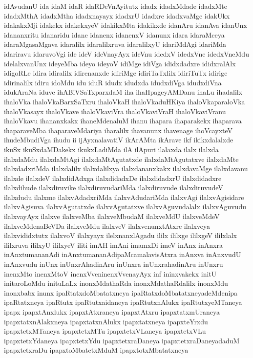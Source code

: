 {idAvudanU
ida
idaM
idaR
idaRDeVnAyitutx
idadx
idadxMdade
idadxMte
idadxMthA
idadxMtha
idadxnayayx
idadxrU
idadxre
idadxvaMge
idakUkx
idakakxMji
idakekx
idakekxyeV
idakikxMta
idakikxde
idanAru
idanAva
idanUnx
idananxritu
idanaridu
idane
idanenx
idanenxV
idanunx
idara
idaraMceya
idaraMgasaMgava
idaralilx
idaralilxruva
idaralilxyU
idariMdAgi
idariMda
idariravu
idaruvoVgi
ide
ideV
ideVnayAyx
ideVnu
idedxV
idedxVne
idedxVneMdu
idelalxvanUnx
ideyeMba
ideyo
ideyoV
idiMge
idiVga
ididxdadxre
ididxralAlx
idigoRLe
idira
idiralilx
idirenanxde
idiriMge
idiriTaTxlilx
idiriTuTx
idirige
idirinalilx
idiru
idoMdu
idu
iduR
idudx
idudxda
idudxdiVga
idudxdiVna
idukAraNa
iduve
ihABiVSaTxparxdaM
iha
ihaHpageyAMDanu
ihaLu
ihadalilx
ihaloVka
ihaloVkaBarxSaTxru
ihaloVkaH
ihaloVkaduHKiya
ihaloVkaparaloVka
ihaloVkasayx
ihaloVkave
ihaloVkaviVra
ihaloVkaviVraH
ihaloVkaviVranu
ihaloVkavu
ihananxkakx
ihaneMdenaluM
ihanu
ihapara
ihaparakekx
ihaparava
ihaparaveMba
ihaparaveMdariya
iharalilx
ihavanunx
ihavenage
ihoVcayxteV
ihudeMbudiVga
ihudu
ii
ijAyxnalavatiV
ikArAMta
ikArave
ikf
ikikxdalalxde
ikuSx
ikuSxdaMDakekx
ikukxLadiMda
ilA
ilApuri
ilalaxda
ilalx
ilalxda
ilalxdaMdu
ilalxdaMtAgi
ilalxdaMtAgutatxde
ilalxdaMtAgutatxve
ilalxdaMte
ilalxdadxriMda
ilalxdalilx
ilalxdalilxya
ilalxdananxkakx
ilalxdavaMge
ilalxdavanu
ilalxde
ilalxdeV
ilalxdidAdxga
ilalxdidadxDe
ilalxdidadxrU
ilalxdidadxre
ilalxdihude
ilalxdiruvike
ilalxdiruvudariMda
ilalxdiruvude
ilalxdiruvudeV
ilalxdudu
ilalxme
ilalxvAdadxriMda
ilalxvAdudariMda
ilalxvAgi
ilalxvAgisidare
ilalxvAgisuva
ilalxvAgutatxde
ilalxvAgutatxve
ilalxvAguvudalalx
ilalxvAguvudu
ilalxvayAyx
ilalxve
ilalxveMba
ilalxveMbudaM
ilalxveMdU
ilalxveMdeV
ilalxveMdenaBeVDa
ilalxveMdu
ilalxveV
ilalxvenunxtAtxre
ilalxveya
ilalxvididxtutx
ilalxvoV
ilalxyayx
ilelxnanxlAgadu
ililx
ililxge
ililxgeV
ililxlalx
ililxruva
ililxyU
ililxyeV
iliti
imAH
imAni
imamxDi
imeV
inAnx
inAnxra
inAnxtumananAdi
inAnxtumananAdipaMcamalavisAtxra
inAnxva
inAnxvudU
inAnxvudu
inUnx
inUnxrAhadinAru
inUnxra
inUnxrahadinAru
inUnxru
inenxMto
inenxMtoV
inenxVveninenxVvenayAyx
inf
ininxvakekx
initU
initaroLoMdu
inituLaLx
inonxMdathaRda
inonxMdathaRdalilx
inonxMdu
inonxbabx
inunx
ipaRtatxdoMbatatxneya
ipaRtatxdoMbatatxneyadeMdenipa
ipaRtatxneya
ipaRtutx
ipaRtutxaidaneya
ipaRtutxnAlukx
ipaRtutxyeMTaneya
ipapx
ipapxtAnxlukx
ipapxtAtxraneya
ipapxtAtxru
ipapxtatxmUraneya
ipapxtatxnAlakxneya
ipapxtatxnAlukx
ipapxtatxneya
ipapxteYrxdu
ipapxtetxMTaneya
ipapxtetxMTu
ipapxtetxVLaneya
ipapxtetxVLu
ipapxtetxYdaneya
ipapxtetxYdu
ipapxtetxraDaneya
ipapxtetxraDaneyadaduM
ipapxtetxraDu
ipapxtoMbatetxMduM
ipapxtotxMbatatxneya
}

